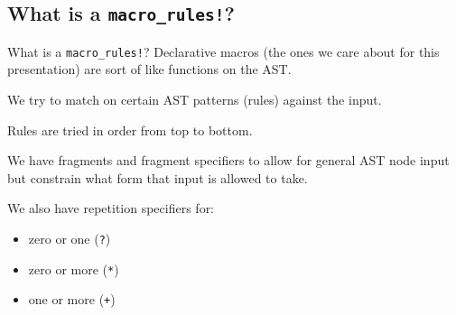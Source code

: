 \documentclass{beamer}
\begin{document}
	\subsection[What is a macro\_rules!]{What is a {\color{macrorulescolor}\texttt{macro\_rules!}}?}
	\begin{frame}{What is a {\color{macrorulescolor}\texttt{macro\_rules!}}?}
		Declarative macros (the ones we care about for this presentation) are sort of like functions
		on the AST. \\

		\pause

		We try to match on certain AST patterns (rules) against the input. \\

		\pause

		Rules are tried in order from top to bottom. \\

		\pause

		We have fragments and fragment specifiers to allow for general AST node input but constrain
		what form that input is allowed to take. \\

		\pause

		We also have repetition specifiers for:
		\begin{itemize}
			\item zero or one (\texttt{?})
			\item zero or more (\texttt{*})
			\item one or more (\texttt{+})
		\end{itemize}
	\end{frame}
\end{document}

